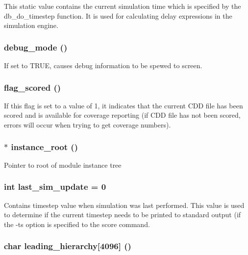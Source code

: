 This static value contains the current simulation time which is specified by the db\_\-do\_\-timestep function. It is used for calculating delay expressions in the simulation engine. 
\subsubsection{ {\bf debug\_\-mode} ()}\label{db_8c_a11}


If set to TRUE, causes debug information to be spewed to screen. 
\subsubsection{ {\bf flag\_\-scored} ()}\label{db_8c_a9}


If this flag is set to a value of 1, it indicates that the current CDD file has been scored and is available for coverage reporting (if CDD file has not been scored, errors will occur when trying to get coverage numbers). 
\subsubsection{$\ast$ {\bf instance\_\-root} ()}\label{db_8c_a1}


Pointer to root of module instance tree 
\subsubsection{\setlength{\rightskip}{0pt plus 5cm}int {\bf last\_\-sim\_\-update} = 0}\label{db_8c_a19}


Contains timestep value when simulation was last performed. This value is used to determine if the current timestep needs to be printed to standard output (if the -ts option is specified to the score command. 
\subsubsection{\setlength{\rightskip}{0pt plus 5cm}char {\bf leading\_\-hierarchy}[4096] ()}\label{db_8c_a8}


